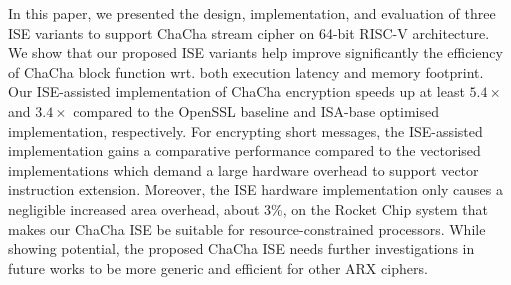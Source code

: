 In this paper, we presented the design, implementation, and evaluation of three ISE variants to support ChaCha stream cipher on 64-bit RISC-V architecture.
We show that our proposed ISE variants help improve significantly the efficiency of ChaCha block function wrt. both execution latency and memory footprint.  
Our ISE-assisted implementation of ChaCha encryption speeds up at least $5.4\times$ and $3.4\times$ compared to the OpenSSL baseline and ISA-base optimised implementation, respectively. 
For encrypting short messages, the ISE-assisted implementation gains a comparative performance compared to the vectorised implementations which demand a large hardware overhead to support vector instruction extension.
Moreover, the ISE hardware implementation only causes a negligible increased area overhead, about 3\%, on the Rocket Chip system that makes our ChaCha ISE be suitable for resource-constrained processors. While showing potential, the proposed ChaCha ISE needs further investigations in future works to be more generic and efficient for other ARX ciphers.




